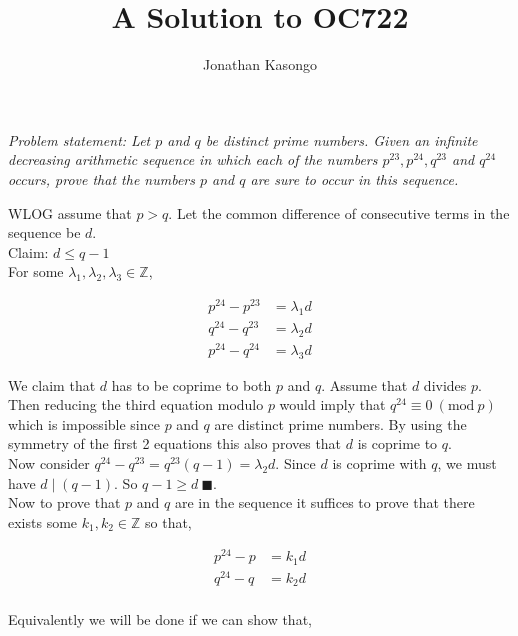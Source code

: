 \documentclass[11pt]{article}
\title{A Solution to OC722}
\author{Jonathan Kasongo}
\begin{document}
\maketitle

\noindent
\textit{
Problem statement: Let $p$ and $q$ be distinct prime numbers. Given an infinite decreasing
arithmetic sequence in which each of the numbers $p^{23}, p^{24}, q^{23}$ and $q^{24}$ occurs,
prove that the numbers $p$ and $q$ are sure to occur in this sequence.\\
}
\vspace{0.2cm}

\noindent
WLOG assume that $p > q$. Let the common difference of consecutive terms in the sequence be $d$. \\

\noindent
{\sffamily Claim: $d \leq q-1$} \\

\noindent
For some $\lambda_1, \lambda_2, \lambda_3 \in \mathbb{Z}$,

\begin{align*}
p^{24} - p^{23} &= \lambda_1 d \\
q^{24} - q^{23} &= \lambda_2 d \\
p^{24} - q^{24} &= \lambda_3 d
\end{align*}

\noindent
We claim that $d$ has to be coprime to both $p$ and $q$. Assume that $d$ divides $p$. Then reducing the third equation modulo $p$ would imply that $q^{24} \equiv 0 \ (\text{mod} \ p)$ which is
impossible since $p$ and $q$ are distinct prime numbers. By using the symmetry of the first 2 equations this also proves that $d$ is coprime to $q$. \\

\noindent
Now consider $q^{24} - q^{23} = q^{23}(q-1) = \lambda_2 d$. Since $d$ is coprime with $q$, we must have $d \mid (q-1)$. So $q-1 \geq d \ \blacksquare$. \\

\noindent
Now to prove that $p$ and $q$ are in the sequence it suffices to prove that there exists some $k_1, k_2 \in \mathbb{Z}$ so that,

\begin{align*}
p^{24} - p &= k_1 d \\
q^{24} - q &= k_2 d \\
\end{align*}

\noindent
Equivalently we will be done if we can show that,
\end{document}
